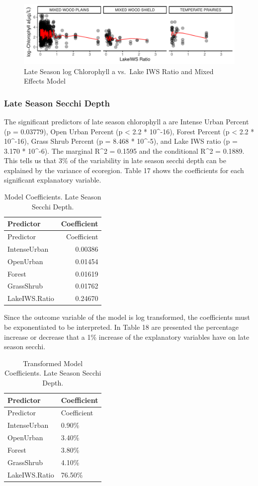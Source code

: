\documentclass[12pt,]{article}
\begin{document}
\begin{figure}
\centering
\includegraphics{Bollt_Greif_Raby_Roth_Project_Final_files/figure-latex/unnamed-chunk-32-1.pdf}
\caption{Late Season log Chlorophyll a vs.~Lake IWS Ratio and Mixed
Effects Model}
\end{figure}

\hypertarget{late-season-secchi-depth}{%
\subsubsection{Late Season Secchi
Depth}\label{late-season-secchi-depth}}

The significant predictors of late season chlorophyll a are Intense
Urban Percent (p = 0.03779), Open Urban Percent (p \textless{} 2.2 *
10\^{}-16), Forest Percent (p \textless{} 2.2 * 10\^{}-16), Grass Shrub
Percent (p = 8.468 * 10\^{}-5), and Lake IWS ratio (p = 3.170 *
10\^{}-6). The marginal R\^{}2 = 0.1595 and the conditional R\^{}2 =
0.1889. This tells us that 3\% of the variability in late season secchi
depth can be explained by the variance of ecoregion. Table 17 shows the
coefficients for each significant explanatory variable.

\newpage

\begin{longtable}[]{@{}lr@{}}
\caption{Model Coefficients. Late Season Secchi Depth.}\tabularnewline
\toprule
Predictor & Coefficient\tabularnewline
\midrule
\endfirsthead
\toprule
Predictor & Coefficient\tabularnewline
\midrule
\endhead
IntenseUrban & 0.00386\tabularnewline
OpenUrban & 0.01454\tabularnewline
Forest & 0.01619\tabularnewline
GrassShrub & 0.01762\tabularnewline
LakeIWS.Ratio & 0.24670\tabularnewline
\bottomrule
\end{longtable}

Since the outcome variable of the model is log transformed, the
coefficients must be exponentiated to be interpreted. In Table 18 are
presented the percentage increase or decrease that a 1\% increase of the
explanatory variables have on late season secchi.

\begin{longtable}[]{@{}ll@{}}
\caption{Transformed Model Coefficients. Late Season Secchi
Depth.}\tabularnewline
\toprule
Predictor & Coefficient\tabularnewline
\midrule
\endfirsthead
\toprule
Predictor & Coefficient\tabularnewline
\midrule
\endhead
IntenseUrban & 0.90\%\tabularnewline
OpenUrban & 3.40\%\tabularnewline
Forest & 3.80\%\tabularnewline
GrassShrub & 4.10\%\tabularnewline
LakeIWS.Ratio & 76.50\%\tabularnewline
\bottomrule
\end{longtable}
\end{document}
